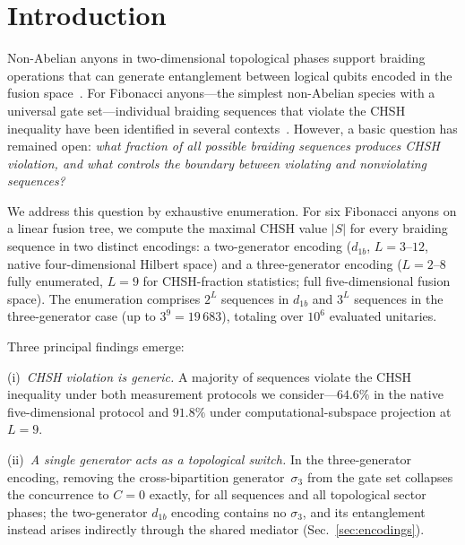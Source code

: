 \documentclass[aps,pra,twocolumn,superscriptaddress,longbibliography,floatfix,nofootinbib]{revtex4-2}
\begin{document}
\maketitle



\section{Introduction}
\label{sec:intro}

Non-Abelian anyons in two-dimensional topological phases support
braiding operations that can generate entanglement between logical
qubits encoded in the fusion space~\cite{Nayak2008,Freedman2003}.
For Fibonacci anyons---the simplest non-Abelian species with a
universal gate set---individual braiding sequences that violate
the CHSH inequality have been identified in several
contexts~\cite{Bonesteel2005,Hormozi2007}.
However, a basic question has remained open:
\emph{what fraction of all possible braiding sequences produces
CHSH violation, and what controls the boundary between violating
and nonviolating sequences?}

We address this question by exhaustive enumeration.
For six Fibonacci anyons on a linear fusion tree, we compute the
maximal CHSH value $|S|$ for every braiding sequence in two
distinct encodings: a two-generator encoding
($d_{1b}$, $L=3$--$12$, native four-dimensional Hilbert space)
and a three-generator encoding ($L=2$--$8$ fully enumerated,
$L=9$ for CHSH-fraction statistics; full five-dimensional
fusion space).
The enumeration comprises $2^L$ sequences in $d_{1b}$ and $3^L$
sequences in the three-generator case (up to $3^9=19\,683$),
totaling over $10^6$ evaluated unitaries.

Three principal findings emerge:

(i)~\emph{CHSH violation is generic.}
A majority of sequences violate the CHSH inequality
under both measurement protocols we consider---$64.6\%$ in
the native five-dimensional protocol and $91.8\%$ under
computational-subspace projection at $L=9$.

(ii)~\emph{A single generator acts as a topological switch.}
In the three-generator encoding, removing the cross-bipartition
generator~$\sigma_3$ from the gate set collapses the concurrence to
$C=0$ exactly, for all sequences and all topological sector phases;
the two-generator $d_{1b}$ encoding contains no $\sigma_3$, and its
entanglement instead arises indirectly through the shared mediator
(Sec.~\ref{sec:encodings}).
\end{document}
